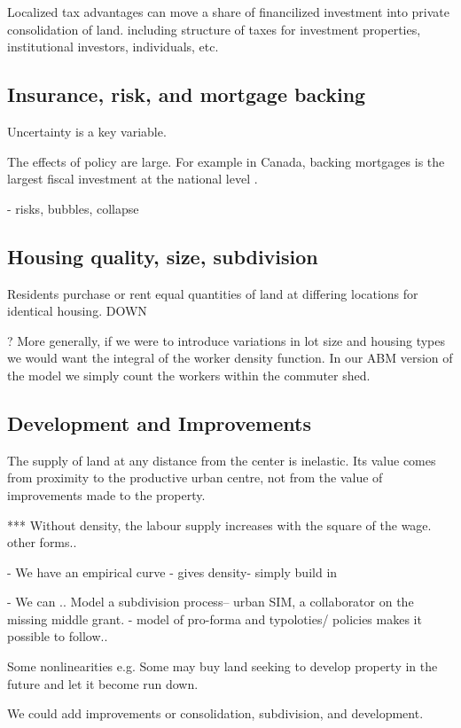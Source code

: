 Localized tax advantages can move a share of financilized investment into private consolidation of land.
including structure of taxes for investment properties, institutional investors, individuals, etc.


\subsection{Insurance, risk, and mortgage backing}

Uncertainty is a key variable.

The effects of policy are large. For example in Canada, backing mortgages is the largest fiscal investment at the national level \cite{nemtinFinancializationHousingSocial2021}.

- risks, bubbles, collapse


\subsection{Housing quality, size, subdivision}
Residents  purchase or rent equal quantities of land at differing locations %
for identical housing.  DOWN

? More generally, if we were to introduce variations in lot size and housing types  we would want the integral of the worker density function. In our ABM version  of the model we simply count the workers within the commuter shed.

\subsection{Development and Improvements}
The supply of land at any distance from the center is inelastic. 
Its value comes from proximity to the productive urban centre, not from the value of improvements made to the property.

*** Without density, the labour supply increases with the square of the wage.  other forms..

- We have an empirical curve - gives density- simply build in

- We can .. Model a subdivision process-- urban SIM, a collaborator on the missing middle grant. - model of pro-forma and typoloties/ policies makes it possible to follow..

Some nonlinearities e.g. Some may buy land seeking to develop property in the future and let it become run down. 

We could add improvements
 or consolidation, subdivision, and development. 

